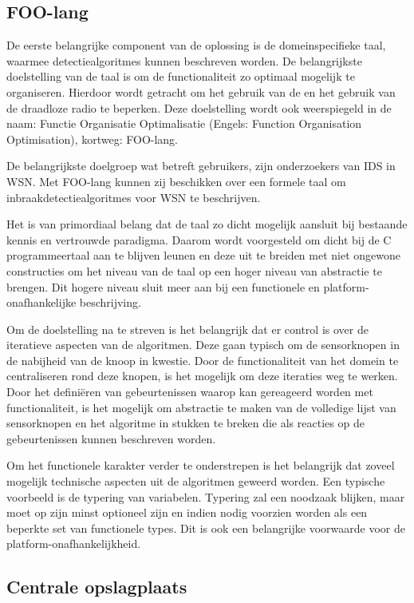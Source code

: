 \subsection{FOO-lang}
\label{subsection:arch-foo-lang}

De eerste belangrijke component van de oplossing is de domeinspecifieke taal,
waarmee detectiealgoritmes kunnen beschreven worden. De belangrijkste
doelstelling van de taal is om de functionaliteit zo optimaal mogelijk te
organiseren. Hierdoor wordt getracht om het gebruik van de \mcu en het gebruik
van de draadloze radio te beperken. Deze doelstelling wordt ook weerspiegeld in
de naam: Functie Organisatie Optimalisatie (Engels: Function Organisation
Optimisation), kortweg: FOO-lang.

De belangrijkste doelgroep wat betreft gebruikers, zijn onderzoekers van IDS in
WSN. Met FOO-lang kunnen zij beschikken over een formele taal om
inbraakdetectiealgoritmes voor WSN te beschrijven.

Het is van primordiaal belang dat de taal zo dicht mogelijk aansluit bij
bestaande kennis en vertrouwde paradigma. Daarom wordt voorgesteld om dicht bij
de C programmeertaal aan te blijven leunen en deze uit te breiden met niet
ongewone constructies om het niveau van de taal op een hoger niveau van
abstractie te brengen. Dit hogere niveau sluit meer aan bij een functionele en
platform-onafhankelijke beschrijving.

Om de doelstelling na te streven is het belangrijk dat er control is over de
iteratieve aspecten van de algoritmen. Deze gaan typisch om de sensorknopen in
de nabijheid van de knoop in kwestie. Door de functionaliteit van het domein te
centraliseren rond deze knopen, is het mogelijk om deze iteraties weg te
werken. Door het defini\"eren van gebeurtenissen waarop kan gereageerd worden
met functionaliteit, is het mogelijk om abstractie te maken van de volledige
lijst van sensorknopen en het algoritme in stukken te breken die als reacties
op de gebeurtenissen kunnen beschreven worden.

Om het functionele karakter verder te onderstrepen is het belangrijk dat zoveel
mogelijk technische aspecten uit de algoritmen geweerd worden. Een typische
voorbeeld is de typering van variabelen. Typering zal een noodzaak blijken,
maar moet op zijn minst optioneel zijn en indien nodig voorzien worden als een
beperkte set van functionele types. Dit is ook een belangrijke voorwaarde voor
de platform-onafhankelijkheid.

\subsection{Centrale opslagplaats}
\label{subsection:arch-repository}

